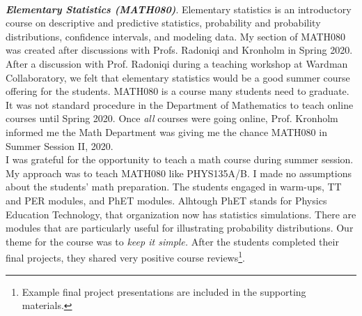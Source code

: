 \documentclass[../../../main.tex]{subfiles}
\begin{document}
\\
\vspace{0.15cm}
\textbf{\textit{Elementary Statistics (MATH080)}}. Elementary statistics is an introductory course on descriptive and predictive statistics, probability and probability distributions, confidence intervals, and modeling data.  My section of MATH080 was created after discussions with Profs. Radoniqi and Kronholm in Spring 2020.  After a discussion with Prof. Radoniqi during a teaching workshop at Wardman Collaboratory, we felt that elementary statistics would be a good summer course offering for the students.  MATH080 is a course many students need to graduate.  It was not standard procedure in the Department of Mathematics to teach online courses until Spring 2020.  Once \textit{all} courses were going online, Prof. Kronholm informed me the Math Department was giving me the chance MATH080 in Summer Session II, 2020.
\\
\vspace{0.15cm}
I was grateful for the opportunity to teach a math course during summer session.  My approach was to teach MATH080 like PHYS135A/B.  I made no assumptions about the students' math preparation.  The students engaged in warm-ups, TT and PER modules, and PhET modules.  Alhtough PhET stands for Physics Education Technology, that organization now has statistics simulations.  There are modules that are particularly useful for illustrating probability distributions.  Our theme for the course was to \textit{keep it simple.}  After the students completed their final projects, they shared very positive course reviews\footnote{Example final project presentations are included in the supporting materials.}.
\end{document}
